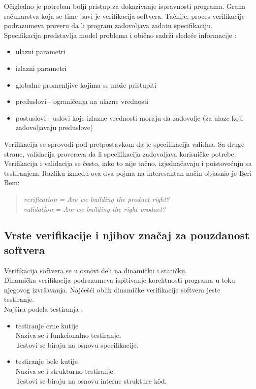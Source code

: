 \documentclass[a4paper]{article}
\begin{document}
Očigledno je potreban bolji pristup za dokazivanje ispravnosti programa. Grana računarstva koja se time bavi je verifikacija softvera.
Tačnije, proces verifikacije podrazumeva proveru da li program zadovoljava zadatu specifikaciju. Specifikacija predstavlja model problema i obično sadrži sledeće informacije \cite{laski2009software}:
\begin{itemize}
\item ulazni parametri
\item izlazni parametri
\item globalne promenljive kojima se može pristupiti
\item preduslovi - ograničenja na ulazne vrednosti
\item postuslovi - uslovi koje izlazne vrednosti moraju da zadovolje (za ulaze koji zadovoljavaju preduslove)
\end{itemize}
Verifikacija se sprovodi pod pretpostavkom da je specifikacija validna. Sa druge strane, validacija proverava da li specifikacija zadovoljava korisničke potrebe. Verifikacija i validacija se često, iako to nije tačno, izjednačavaju i poistovećuju sa testiranjem. Razliku između ova dva pojma na interesantan način objasnio je Beri Bem:
\begin{quote}
\emph{verification = Are we building the product right? \\
validation = Are we building the right product?}
\end{quote}

\subsection{Vrste verifikacije i njihov značaj za pouzdanost softvera}
\label{subsec:verifikacija}
Verifikacija softvera se u osnovi deli na dinamičku i statičku.\\
Dinamička verifikacija podrazumeva ispitivanje korektnosti programa u toku njegovog izvršavanja.
Najčešći oblik dinamičke verifikacije softvera jeste testiranje.\\
Najšira podela testiranja \cite{laski2009software}:
\begin{itemize}
\item testiranje crne kutije\\
Naziva se i funkcionalno testiranje.\\
Testovi se biraju na osnovu specifikacije.
\item testiranje bele kutije\\
Naziva se i strukturno testiranje.\\
Testovi se biraju na osnovu interne strukture k\^{o}d.
\end{itemize}
\end{document}
